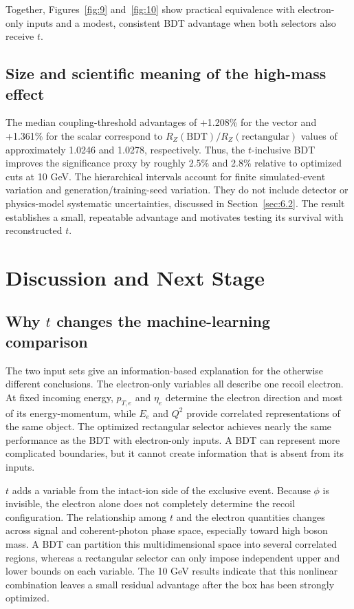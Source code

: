 \documentclass[particles,article,submit,moreauthors,pdftex]{Definitions/mdpi}
\begin{document}
Together, Figures~\ref{fig:9} and~\ref{fig:10} show practical equivalence with electron-only inputs and a modest, consistent BDT advantage when both selectors also receive $t$.

\subsection{Size and scientific meaning of the high-mass effect}\label{sec:5.5}

The median coupling-threshold advantages of +1.208\% for the vector and +1.361\% for the scalar correspond to $R_Z(\mathrm{BDT})/R_Z(\mathrm{rectangular})$ values of approximately 1.0246 and 1.0278, respectively. Thus, the $t$-inclusive BDT improves the significance proxy by roughly 2.5\% and 2.8\% relative to optimized cuts at 10 GeV. The hierarchical intervals account for finite simulated-event variation and generation/training-seed variation. They do not include detector or physics-model systematic uncertainties, discussed in Section~\ref{sec:6.2}. The result establishes a small, repeatable advantage and motivates testing its survival with reconstructed $t$.

\section{Discussion and Next Stage}\label{sec:6}

\subsection{Why \texorpdfstring{$t$}{t} changes the machine-learning comparison}\label{sec:6.1}

The two input sets give an information-based explanation for the otherwise different conclusions. The electron-only variables all describe one recoil electron. At fixed incoming energy, $p_{T,e}$ and $\eta_e$ determine the electron direction and most of its energy-momentum, while $E_e$ and $Q^2$ provide correlated representations of the same object. The optimized rectangular selector achieves nearly the same performance as the BDT with electron-only inputs. A BDT can represent more complicated boundaries, but it cannot create information that is absent from its inputs.

$t$ adds a variable from the intact-ion side of the exclusive event. Because $\phi$ is invisible, the electron alone does not completely determine the recoil configuration. The relationship among $t$ and the electron quantities changes across signal and coherent-photon phase space, especially toward high boson mass. A BDT can partition this multidimensional space into several correlated regions, whereas a rectangular selector can only impose independent upper and lower bounds on each variable. The 10 GeV results indicate that this nonlinear combination leaves a small residual advantage after the box has been strongly optimized.
\end{document}
